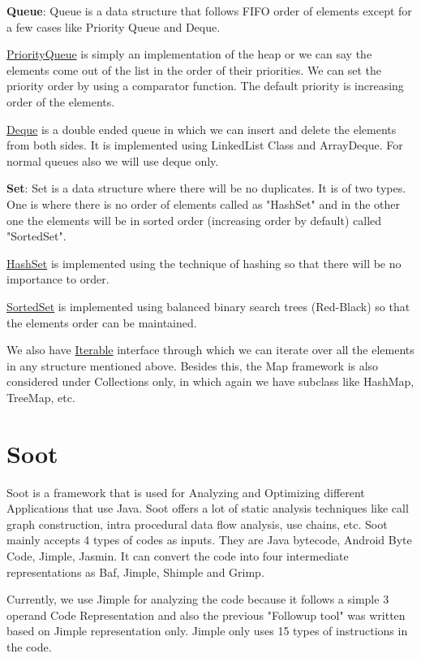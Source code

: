 \textbf{Queue}: Queue is a data structure that follows FIFO order of elements except for a few cases like Priority Queue and Deque.

\underline{PriorityQueue} is simply an implementation of the heap or we can say the elements come out of the list in the order of their priorities. We can set the priority order by using a comparator function. The default priority is increasing order of the elements.

\underline{Deque} is a double ended queue in which we can insert and delete the elements from both sides. It is implemented using LinkedList Class and ArrayDeque. For normal queues also we will use deque only.

\textbf{Set}: Set is a data structure where there will be no duplicates. It is of two types. One is where there is no order of elements called as "HashSet" and in the other one the elements will be in sorted order (increasing order by default) called "SortedSet".

\underline{HashSet} is implemented using the technique of hashing so that there will be no importance to order.

\underline{SortedSet} is implemented using balanced binary search trees (Red-Black) so that the elements order can be maintained.

We also have \underline{Iterable} interface through which we can iterate over all the elements in any structure mentioned above. Besides this, the Map framework is also considered under Collections only, in which again we have subclass like HashMap, TreeMap, etc.

\section{Soot}
Soot \cite{Sable_McGill} \cite{Soot_2008} is a framework that is used for Analyzing and Optimizing different Applications that use Java. Soot offers a lot of static analysis techniques like call graph construction, intra procedural data flow analysis, use chains, etc. Soot mainly accepts 4 types of codes as inputs. They are Java bytecode, Android Byte Code, Jimple, Jasmin. It can convert the code into four intermediate representations as Baf, Jimple, Shimple and Grimp.

Currently, we use Jimple for analyzing the code because it follows a simple 3 operand Code Representation and also the previous "Followup tool" was written based on Jimple representation only. Jimple only uses 15 types of instructions in the code.

